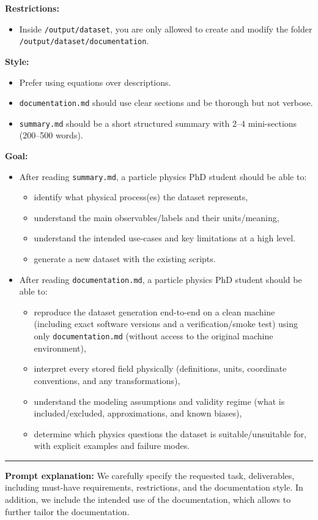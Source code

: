 \documentclass[submission, Phys]{SciPost}
\begin{document}
\begin{userblock}[User]
\textbf{Restrictions:}
\begin{itemize}
\item Inside \lstinline|/output/dataset|, you are only allowed to create and modify the folder \lstinline|/output/dataset/documentation|.
\end{itemize}

\textbf{Style:}
\begin{itemize}
\item Prefer using equations over descriptions.
\item \lstinline|documentation.md| should use clear sections and be thorough but not verbose.
\item \lstinline|summary.md| should be a short structured summary with 2--4 mini-sections (200--500 words).
\end{itemize}

\textbf{Goal:}
\begin{itemize}
\item After reading \lstinline|summary.md|, a particle physics PhD student should be able to:
\begin{itemize}
\item identify what physical process(es) the dataset represents,
\item understand the main observables/labels and their units/meaning,
\item understand the intended use-cases and key limitations at a high level.
\item generate a new dataset with the existing scripts.
\end{itemize}
\item After reading \lstinline|documentation.md|, a particle physics PhD student should be able to:
\begin{itemize}
\item reproduce the dataset generation end-to-end on a clean machine (including exact software versions and a verification/smoke test) using only \lstinline|documentation.md| (without access to the original machine environment),
\item interpret every stored field physically (definitions, units, coordinate conventions, and any transformations),
\item understand the modeling assumptions and validity regime (what is included/excluded, approximations, and known biases),
\item determine which physics questions the dataset is suitable/unsuitable for, with explicit examples and failure modes.
\end{itemize}
\end{itemize}

\vspace{1em}
\hrule
\vspace{1em}

\textbf{Prompt explanation:} We carefully specify the requested task, deliverables, including must-have requirements, restrictions, and the documentation style. In addition, we include the intended use of the documentation, which allows \ma to further tailor the documentation.
\end{userblock}
\end{document}
